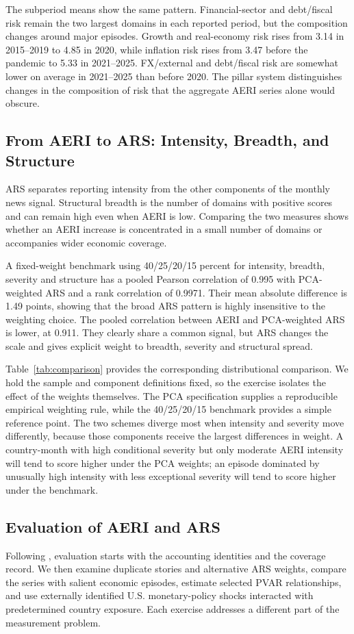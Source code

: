 \documentclass[12pt]{article}
\begin{document}


The subperiod means show the same pattern. Financial-sector and debt/fiscal risk remain the two largest domains in each reported period, but the composition changes around major episodes. Growth and real-economy risk rises from 3.14 in 2015--2019 to 4.85 in 2020, while inflation risk rises from 3.47 before the pandemic to 5.33 in 2021--2025. FX/external and debt/fiscal risk are somewhat lower on average in 2021--2025 than before 2020. The pillar system distinguishes changes in the composition of risk that the aggregate AERI series alone would obscure.
\subsection{From AERI to ARS: Intensity, Breadth, and Structure}\label{sec:aeri_vs_ars}
ARS separates reporting intensity from the other components of the monthly news signal. Structural breadth is the number of domains with positive scores and can remain high even when AERI is low. Comparing the two measures shows whether an AERI increase is concentrated in a small number of domains or accompanies wider economic coverage.

A fixed-weight benchmark using 40/25/20/15 percent for intensity, breadth, severity and structure has a pooled Pearson correlation of 0.995 with PCA-weighted ARS and a rank correlation of 0.9971. Their mean absolute difference is 1.49 points, showing that the broad ARS pattern is highly insensitive to the weighting choice. The pooled correlation between AERI and PCA-weighted ARS is lower, at 0.911. They clearly share a common signal, but ARS changes the scale and gives explicit weight to breadth, severity and structural spread.

Table~\ref{tab:comparison} provides the corresponding distributional comparison. We hold the sample and component definitions fixed, so the exercise isolates the effect of the weights themselves. The PCA specification supplies a reproducible empirical weighting rule, while the 40/25/20/15 benchmark provides a simple reference point. The two schemes diverge most when intensity and severity move differently, because those components receive the largest differences in weight. A country-month with high conditional severity but only moderate AERI intensity will tend to score higher under the PCA weights; an episode dominated by unusually high intensity with less exceptional severity will tend to score higher under the benchmark.
\subsection{Evaluation of AERI and ARS}\label{sec:validation}
Following \citet{baker2016}, evaluation starts with the accounting identities and the coverage record. We then examine duplicate stories and alternative ARS weights, compare the series with salient economic episodes, estimate selected PVAR relationships, and use externally identified U.S. monetary-policy shocks interacted with predetermined country exposure. Each exercise addresses a different part of the measurement problem.
\end{document}
